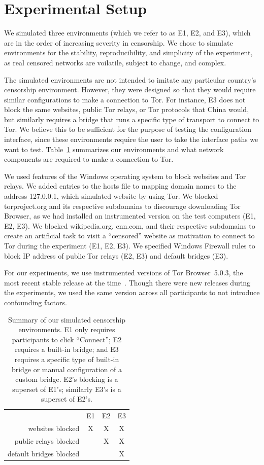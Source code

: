 \documentclass[USenglish,oneside,twocolumn]{article}
\begin{document}
\section{Experimental Setup}
We simulated three environments (which we refer to as E1, E2, and E3), 
which are in the order of increasing severity in censorship. We chose to 
simulate environments for the stability, reproducibility, and simplicity of the 
experiment, as real censored networks are voilatile, subject to change, and complex. 

The simulated environments are not intended to imitate any particular country's censorship environment. However, they were designed so that they would require similar configurations
to make a connection to Tor. For instance, E3 does not block the same websites, public Tor relays, or Tor protocols that China would, but similarly requires a bridge that runs a specific type of transport to connect to Tor. We believe this to be sufficient for the purpose of testing the configuration interface, since these environments require the user to take the interface paths we want to test. Table~\ref{tab:environments} summarizes our
environments and what network components are required to make a 
connection to Tor. 

We used features of the Windows operating system 
to block websites and Tor relays. 
We added entries to the hosts file to
mapping domain names to the address 127.0.0.1, which simulated
website by using Tor. We blocked torproject.org and its respective subdomains to discourage downloading Tor Browser, as we had installed an instrumented version on the test computers (E1, E2, E3).  We blocked wikipedia.org, cnn.com, and their respective subdomains to create an artificial task to visit a 
``censored'' website as motivation to connect to Tor during the experiment (E1, E2, E3). 
We specified Windows Firewall rules to block IP address of public Tor relays (E2, E3) and default bridges (E3).

For our experiments, we use instrumented versions of Tor Browser~5.0.3, 
the most recent stable release at the time~\cite{torbrowser-503}.
Though there were new releases during the experiments,
we used the same version across all participants to not introduce
confounding factors.

\begin{table}[t]
\centering
\begin{tabular}{r c c c}
& E1 & E2 & E3 \\
websites blocked & X & X & X \\
public relays blocked & & X & X \\
default bridges blocked & & & X \\
\end{tabular}
\caption{
Summary of our simulated censorship environments.
E1 only requires participants to click ``Connect'';
E2 requires a built-in bridge;
and E3 requires a specific type of built-in bridge
or manual configuration of a custom bridge.
E2's blocking is a superset of E1's;
similarly E3's is a superset of E2's.
}
\label{tab:environments}
\end{table}
\end{document}
